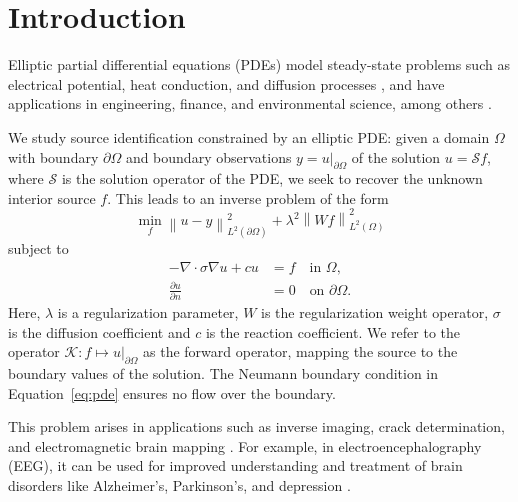 \section{Introduction}
\label{sec:intro}


Elliptic partial differential equations (PDEs) model steady-state problems such as electrical potential, heat conduction, and diffusion processes \cite{straussPartialDifferentialEquations2007}, and have applications in engineering, finance, and environmental science, among others \cite{evansPartialDifferentialEquations2010,pavliotisStochasticProcessesApplications2014}.

We study source identification constrained by an elliptic PDE: given a domain $\Omega$ with boundary $\partial\Omega$ and boundary observations $y = u|_{\partial\Omega}$ of the solution $u = \mathcal{S}f$, where $\mathcal{S}$ is the solution operator of the PDE, we seek to recover the unknown interior source $f$. This leads to an inverse problem of the form
\begin{equation}\label{eq:problem}
    \min_{f} \left\| u - y \right\|_{L^2(\partial\Omega)}^2
    + \lambda^2 \left\| W f \right\|_{L^2(\Omega)}^2
\end{equation}
subject to
\begin{equation}\label{eq:pde}
    \begin{aligned}
    -\nabla \cdot \sigma\nabla u + c u &= f \quad \text{in } \Omega, \\
    \frac{\partial u}{\partial n} &= 0 \quad \text{on } \partial\Omega.
    \end{aligned}
\end{equation}
Here, $\lambda$ is a regularization parameter, $W$ is the regularization weight operator, $\sigma$ is the diffusion coefficient and $c$ is the reaction coefficient. We refer to the operator $\mathcal{K}: f \mapsto u|_{\partial\Omega}$ as the forward operator, mapping the source to the boundary values of the solution. The Neumann boundary condition in Equation~\eqref{eq:pde} ensures no flow over the boundary.

This problem arises in applications such as inverse imaging, crack determination, and electromagnetic brain mapping \cite{nielsenComputingIschemicRegions2013,elulGenesisEEG1971,PDFRecoveryCracks}. For example, in electroencephalography (EEG), it can be used for improved understanding and treatment of brain disorders like Alzheimer's, Parkinson's, and depression \cite{elulGenesisEEG1971, ElectromagneticBrainMapping}.

